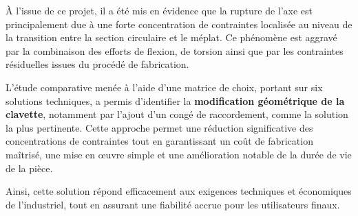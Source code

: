 \documentclass{rapportECL}
\begin{document}
À l’issue de ce projet, il a été mis en évidence que la rupture de l’axe est principalement due à une forte concentration de contraintes localisée au niveau de la transition entre la section circulaire et le méplat. Ce phénomène est aggravé par la combinaison des efforts de flexion, de torsion ainsi que par les contraintes résiduelles issues du procédé de fabrication.

L’étude comparative menée à l’aide d’une matrice de choix, portant sur six solutions techniques, a permis d’identifier la \textbf{modification géométrique de la clavette}, notamment par l’ajout d’un congé de raccordement, comme la solution la plus pertinente. Cette approche permet une réduction significative des concentrations de contraintes tout en garantissant un coût de fabrication maîtrisé, une mise en œuvre simple et une amélioration notable de la durée de vie de la pièce.

Ainsi, cette solution répond efficacement aux exigences techniques et économiques de l’industriel, tout en assurant une fiabilité accrue pour les utilisateurs finaux.
\end{document}

